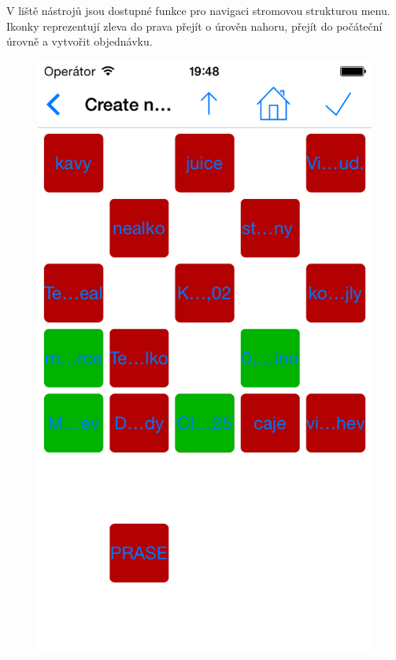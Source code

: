 V liště nástrojů jsou dostupné funkce pro navigaci stromovou strukturou menu.
Ikonky reprezentují zleva do prava přejít o úrověn nahoru, přejít do počáteční úrovně a vytvořit objednávku.\\

\begin{figure}
\centering
\begin{minipage}{.5\textwidth}
  \centering
  \includegraphics[width=.95\textwidth]{order1.png}
  \label{fig:createorderpage1}
\end{minipage}%
\begin{minipage}{.5\textwidth}

\end{minipage}
\end{figure}

